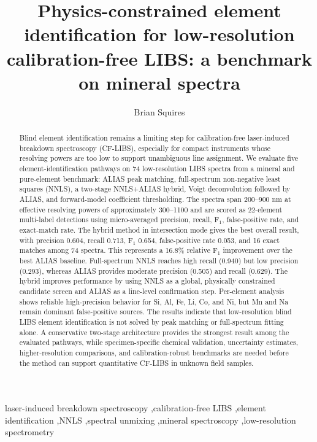 \documentclass[preprint,12pt,authoryear]{elsarticle}
\begin{document}
\begin{frontmatter}

\title{Physics-constrained element identification for low-resolution calibration-free LIBS: a benchmark on mineral spectra}

\author[inst1]{Brian Squires}

\begin{abstract}
Blind element identification remains a limiting step for calibration-free laser-induced breakdown spectroscopy (CF-LIBS), especially for compact instruments whose resolving powers are too low to support unambiguous line assignment. We evaluate five element-identification pathways on 74 low-resolution LIBS spectra from a mineral and pure-element benchmark: ALIAS peak matching, full-spectrum non-negative least squares (NNLS), a two-stage NNLS+ALIAS hybrid, Voigt deconvolution followed by ALIAS, and forward-model coefficient thresholding. The spectra span 200--900 nm at effective resolving powers of approximately 300--1100 and are scored as 22-element multi-label detections using micro-averaged precision, recall, F$_1$, false-positive rate, and exact-match rate. The hybrid method in intersection mode gives the best overall result, with precision 0.604, recall 0.713, F$_1$ 0.654, false-positive rate 0.053, and 16 exact matches among 74 spectra. This represents a 16.8\% relative F$_1$ improvement over the best ALIAS baseline. Full-spectrum NNLS reaches high recall (0.940) but low precision (0.293), whereas ALIAS provides moderate precision (0.505) and recall (0.629). The hybrid improves performance by using NNLS as a global, physically constrained candidate screen and ALIAS as a line-level confirmation step. Per-element analysis shows reliable high-precision behavior for Si, Al, Fe, Li, Co, and Ni, but Mn and Na remain dominant false-positive sources. The results indicate that low-resolution blind LIBS element identification is not solved by peak matching or full-spectrum fitting alone. A conservative two-stage architecture provides the strongest result among the evaluated pathways, while specimen-specific chemical validation, uncertainty estimates, higher-resolution comparisons, and calibration-robust benchmarks are needed before the method can support quantitative CF-LIBS in unknown field samples.
\end{abstract}

\begin{keyword}
laser-induced breakdown spectroscopy \sep calibration-free LIBS \sep element identification \sep NNLS \sep spectral unmixing \sep mineral spectroscopy \sep low-resolution spectrometry
\end{keyword}

\end{frontmatter}
\end{document}
